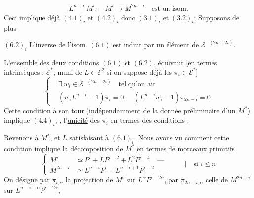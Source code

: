 \[
L^{n-i}|M^i:\quad M^i\longrightarrow M^{2n-i}\quad\text{est un isom.}
\tag*{$(6.1)_i$}
\]
Ceci implique déjà $(4.1)_i$ et $(4.2)_i$ donc $(3.1)_i$ et $(3.2)_i$;  Supposons de plus

$(6.2)_i$ L'inverse de l'isom. $(6.1)$ est  induit par un élément de $\mathcal E^{-(2n-2i)}$.

 L'ensemble des deux conditions $(6.1)$ et $(6.2)$, équivaut [en termes intrinsèques : $\mathcal E^*$, muni de $L\in\mathcal E^2$ si on suppose déjà les $\pi_i\in\mathcal E^*$]
\[
\left\{\begin{aligned}
&\exists\ w_i\in\mathcal E^{-(2n-2i)}\quad\text{tel qu'on ait}\\
&(w_iL^{n-i}-1)\pi_i=0,\quad(L^{n-i}w_i-1)\pi_{2n-i}=0
\end{aligned}\right.
\tag*{$(6.3.)_i$}
\]
Cette condition à son tour (indépendamment de la donnée préliminaire d'un $M^*$) implique $(4.4)_i$, ,  l'\uline{unicité} des $\pi_i$ en termes des conditions .

Revenons à $M^*$, et $L$ satisfaisant à $(6.1)_i$. Nous avons vu comment  cette condition implique la \uline{décomposition de} $M^*$ en termes  de morceaux primitifs
\[
\left\{\begin{aligned}
M^i&\simeq P^i+LP^{i-2}+L^2P^{i-4}\quad\text{---}\\
M^{2n-i}&\simeq L^{n-i}P^i+L^{n-i+1}P^{i-2}\quad\text{---}
\end{aligned}\right.\qquad\bigg|\quad\text{si }i\leq n
\tag{6.4}
\]
On désigne par $\pi_{i,\alpha}$ la projection de $M^i$ sur $L^\alpha P^{i-2\alpha}$, par $\pi_{2n-i,\alpha}$ celle de $M^{2n-i}$ sur $L^{n-i+\alpha}P^{i-2\alpha}$,
